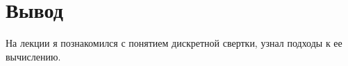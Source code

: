 \chapter{Вывод}
\label{ch:сhap5}

На лекции я познакомился с понятием дискретной свертки, узнал подходы к ее вычислению.

\endinput